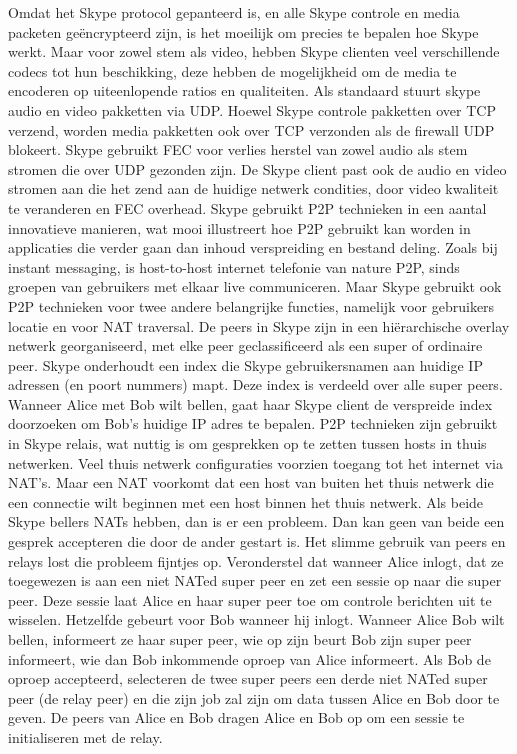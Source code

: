 Omdat het Skype protocol gepanteerd is, en alle Skype controle en media packeten geëncrypteerd zijn, is het moeilijk om precies te bepalen hoe Skype werkt. Maar voor zowel stem als video, hebben Skype clienten veel verschillende codecs tot hun beschikking, deze hebben de mogelijkheid om de media te encoderen op uiteenlopende ratios en qualiteiten. Als standaard stuurt skype audio en video pakketten via UDP. Hoewel Skype controle pakketten over TCP verzend, worden media pakketten ook over TCP verzonden als de firewall UDP blokeert. Skype gebruikt FEC voor verlies herstel van zowel audio als stem stromen die over UDP gezonden zijn. De Skype client past ook de audio en video stromen aan die het zend aan de huidige netwerk condities, door video kwaliteit te veranderen en FEC overhead.
Skype gebruikt P2P technieken in een aantal innovatieve manieren, wat mooi illustreert hoe P2P gebruikt kan worden in applicaties die verder gaan dan inhoud verspreiding en bestand deling. Zoals bij instant messaging, is host-to-host internet telefonie van nature P2P, sinds groepen van gebruikers met elkaar live communiceren. Maar Skype gebruikt ook P2P technieken voor twee andere belangrijke functies, namelijk voor gebruikers locatie en voor NAT traversal.
De peers in Skype zijn in een hiërarchische overlay netwerk georganiseerd, met elke peer geclassificeerd als een super of ordinaire peer. Skype onderhoudt een index die Skype gebruikersnamen aan huidige IP adressen (en poort nummers) mapt. Deze index is verdeeld over alle super peers. Wanneer Alice met Bob wilt bellen, gaat haar Skype client de verspreide index doorzoeken om Bob’s huidige IP adres te bepalen. P2P technieken zijn gebruikt in Skype relais, wat nuttig is om gesprekken op te zetten tussen hosts in thuis netwerken. Veel thuis netwerk configuraties voorzien toegang tot het internet via NAT’s. Maar een NAT voorkomt dat een host van buiten het thuis netwerk die een connectie wilt beginnen met een host binnen het thuis netwerk. Als beide Skype bellers NATs hebben, dan is er een probleem. Dan kan geen van beide een gesprek accepteren die door de ander gestart is. Het slimme gebruik van peers en relays lost die probleem fijntjes op.
Veronderstel dat wanneer Alice inlogt, dat ze toegewezen is aan een niet NATed super peer en zet een sessie op naar die super peer. Deze sessie laat Alice en haar super peer toe om controle berichten uit te wisselen. Hetzelfde gebeurt voor Bob wanneer hij inlogt. Wanneer Alice Bob wilt bellen, informeert ze haar super peer, wie op zijn beurt Bob zijn super peer informeert, wie dan Bob inkommende oproep van Alice informeert. Als Bob de oproep accepteerd, selecteren de twee super peers een derde niet NATed super peer (de relay peer) en die zijn job zal zijn om data tussen Alice en Bob door te geven. De peers van Alice en Bob dragen Alice en Bob op om een sessie te initialiseren met de relay.
